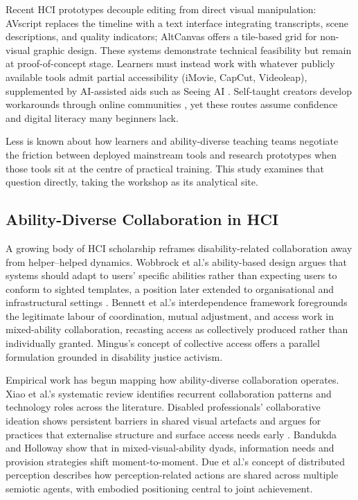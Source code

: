 Recent HCI prototypes decouple editing from direct visual manipulation: AVscript \cite{huh_avscript_2023} replaces the timeline with a text interface integrating transcripts, scene descriptions, and quality indicators; AltCanvas \cite{lee_altcanvas_2024} offers a tile-based grid for non-visual graphic design. These systems demonstrate technical feasibility but remain at proof-of-concept stage. Learners must instead work with whatever publicly available tools admit partial accessibility (iMovie, CapCut, Videoleap), supplemented by AI-assisted aids such as Seeing AI \cite{xiao_understanding_2025}. Self-taught creators develop workarounds through online communities \cite{lyu_i_2024-1,seo_understanding_2021}, yet these routes assume confidence and digital literacy many beginners lack.

Less is known about how learners and ability-diverse teaching teams negotiate the friction between deployed mainstream tools and research prototypes when those tools sit at the centre of practical training. This study examines that question directly, taking the workshop as its analytical site.

\subsection{Ability-Diverse Collaboration in HCI}

A growing body of HCI scholarship reframes disability-related collaboration away from helper--helped dynamics. Wobbrock et al.'s \cite{wobbrock_ability-based_2011} ability-based design argues that systems should adapt to users' specific abilities rather than expecting users to conform to sighted templates, a position later extended to organisational and infrastructural settings \cite{nolte_implementing_2022}. Bennett et al.'s \cite{bennett_interdependence_2018} interdependence framework foregrounds the legitimate labour of coordination, mutual adjustment, and access work in mixed-ability collaboration, recasting access as collectively produced rather than individually granted. Mingus's \cite{mia_mingus_access_2017} concept of collective access offers a parallel formulation grounded in disability justice activism.

Empirical work has begun mapping how ability-diverse collaboration operates. Xiao et al.'s \cite{xiao_systematic_2024} systematic review identifies recurrent collaboration patterns and technology roles across the literature. Disabled professionals' collaborative ideation shows persistent barriers in shared visual artefacts and argues for practices that externalise structure and surface access needs early \cite{das_that_2024}. Bandukda and Holloway \cite{bandukda_context_2024} show that in mixed-visual-ability dyads, information needs and provision strategies shift moment-to-moment. Due et al.'s \cite{due_distributed_2021} concept of distributed perception describes how perception-related actions are shared across multiple semiotic agents, with embodied positioning central to joint achievement.

